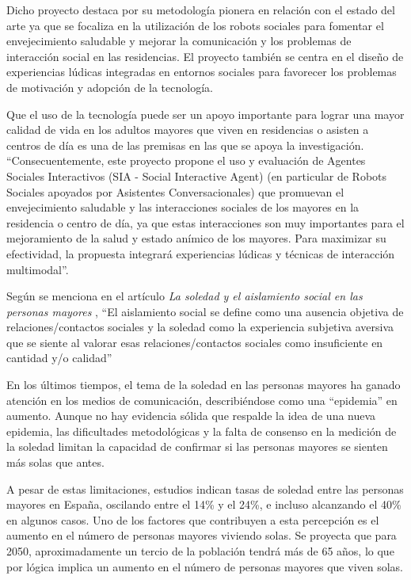 Dicho proyecto destaca por su metodología pionera en relación con el estado del arte ya que se focaliza en la utilización de los robots sociales para fomentar el envejecimiento saludable y mejorar la comunicación y los problemas de interacción social en las residencias. El proyecto también se centra en el diseño de experiencias lúdicas integradas en entornos sociales para favorecer los problemas de motivación y adopción de la tecnología.

Que el uso de la tecnología puede ser un apoyo importante para lograr una mayor calidad de vida en los adultos mayores que viven en residencias o asisten a centros de día es una de las premisas en las que se apoya la investigación. \enquote{Consecuentemente, este proyecto propone el uso y evaluación de Agentes Sociales Interactivos (SIA - Social Interactive Agent) (en particular de Robots Sociales apoyados por Asistentes Conversacionales) que promuevan el envejecimiento saludable y las interacciones sociales de los mayores en la residencia o centro de día, ya que estas interacciones son muy importantes para el mejoramiento de la salud y estado anímico de los mayores. Para maximizar su efectividad, la propuesta integrará experiencias lúdicas y técnicas de interacción multimodal}.

Según se menciona en el artículo \textit{La soledad y el aislamiento social en las personas mayores} \parencite{ArruebarrenaCabaco2020}, \enquote{El aislamiento social se define como una ausencia objetiva de relaciones/contactos sociales y la soledad como la experiencia subjetiva aversiva que se siente al valorar esas relaciones/contactos sociales como
insuficiente en cantidad y/o calidad}

En los últimos tiempos, el tema de la soledad en las personas mayores ha ganado atención en los medios de comunicación, describiéndose como una \enquote{epidemia} en aumento. Aunque no hay evidencia sólida que respalde la idea de una nueva epidemia, las dificultades metodológicas y la falta de consenso en la medición de la soledad limitan la capacidad de confirmar si las personas mayores se sienten más solas que antes.

A pesar de estas limitaciones, estudios indican tasas de soledad entre las personas mayores en España, oscilando entre el 14\% y el 24\%, e incluso alcanzando el 40\% en algunos casos. Uno de los factores que contribuyen a esta percepción es el aumento en el número de personas mayores viviendo solas. Se proyecta que para 2050, aproximadamente un tercio de la población tendrá más de 65 años, lo que por lógica implica un aumento en el número de personas mayores que viven solas.


